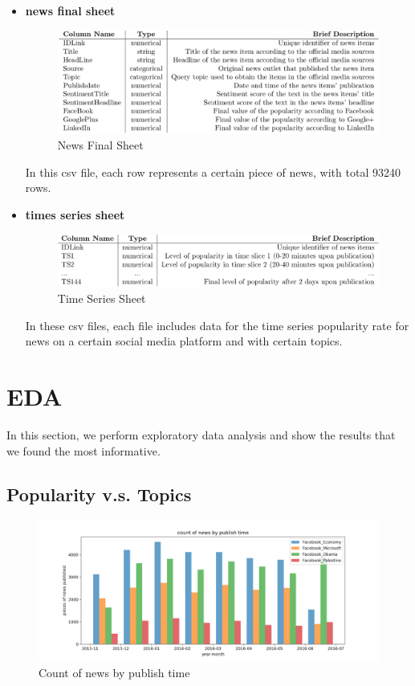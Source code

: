 \documentclass{article}
\begin{document}
\begin{itemize}
\item \textbf{news final sheet}

\begin{figure}[H]
    \centering
    \includegraphics[scale=0.45]{"nf_sheet"}
    \caption{News Final Sheet}
    \end{figure}
    
In this csv file, each row represents a certain piece of news, with total 93240 rows.\par

\item \textbf{times series sheet}

\begin{figure}[H]
    \centering
    \includegraphics[scale=0.45]{"ts_sheet"}
    \caption{Time Series Sheet}
    \end{figure}

In these csv files, each file includes data for the time series popularity rate for news on a certain social media platform and with certain topics.  

\end{itemize}


\newpage
\section{EDA}
In this section, we perform exploratory data analysis and show the results that we found the most informative.

\subsection{Popularity v.s. Topics}
 
\begin{figure}[H]
\centering
\includegraphics[scale=0.17]{"count of news by publish time"}
\caption{Count of news by publish time}
\end{figure}
\end{document}
